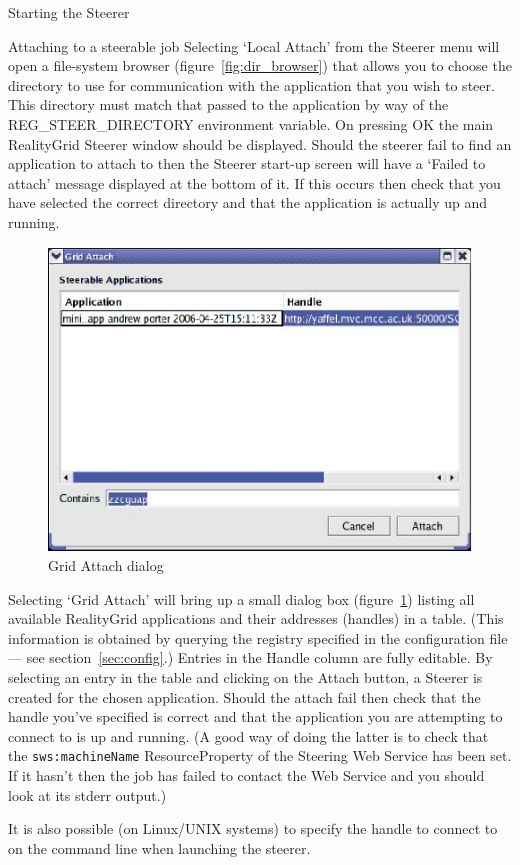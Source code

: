 \documentclass[a4paper,twoside]{article}
\begin{document}
\begin{section}{Starting the Steerer}
\begin{subsection}{Attaching to a steerable job}
Selecting `Local Attach' from the Steerer menu will open a file-system
browser (figure~\ref{fig:dir_browser}) that allows you to choose the
directory to use for communication with the application that you wish
to steer.  This directory must match that passed to the application by
way of the REG\_\-STEER\_\-DIRECTORY environment variable.  On
pressing OK the main RealityGrid Steerer window should be displayed.
Should the steerer fail to find an application to attach to then the
Steerer start-up screen will have a `Failed to attach' message
displayed at the bottom of it.  If this occurs then check that you
have selected the correct directory and that the application is
actually up and running.

\begin{figure}
\centerline{\includegraphics{grid_attach.eps}}
\caption{Grid Attach dialog}
\label{fig:grid_attach}
\end{figure}

Selecting `Grid Attach' will bring up a small dialog box
(figure~\ref{fig:grid_attach}) listing all available RealityGrid
applications and their addresses (handles) in a table.  (This
information is obtained by querying the registry specified in the
configuration file --- see section~\ref{sec:config}.) Entries in the
Handle column are fully editable.  By selecting an entry in the table
and clicking on the Attach button, a Steerer is created for the chosen
application. Should the attach fail then check that the handle you've
specified is correct and that the application you are attempting to
connect to is up and running.  (A good way of doing the latter is to
check that the \texttt{sws:machineName} ResourceProperty of the
Steering Web Service has been set.  If it hasn't then the job
has failed to contact the Web Service and you should look at its
stderr output.)

It is also possible (on Linux/UNIX systems) to specify the handle to
connect to on the command line when launching the steerer.

\end{subsection}
\end{section}
\end{document}
